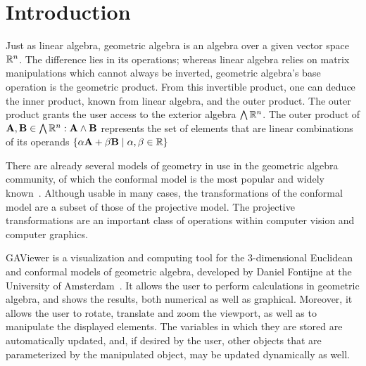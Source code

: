 \section{Introduction}
\label{ch:introduction}


Just as linear algebra, geometric algebra is an algebra over a given vector space $\mathbb{R}^n$.  The difference lies in its operations; whereas linear algebra relies on matrix manipulations which cannot always be inverted, geometric algebra's base operation is the geometric product.  From this invertible product, one can deduce the inner product, known from linear algebra, and the outer product.  The outer product grants the user access to the exterior algebra $\bigwedge \mathbb{R}^n$.  The outer product of $\mathbf{A}, \mathbf{B} \in \bigwedge \mathbb{R}^n: \mathbf{A} \wedge \mathbf{B}$ represents the set of elements that are linear combinations of its operands $\left\{\alpha \mathbf{A} + \beta \mathbf{B} \mid \alpha, \beta \in \mathbb{R} \right\}$

There are already several models of geometry in use in the geometric algebra community, of which the conformal model is the most popular and widely known~\cite{TheBook}.  Although usable in many cases, the transformations of the conformal model are a subset of those of the projective model. The projective transformations are an important class of operations within computer vision and computer graphics. 

GAViewer is a visualization and computing tool for the 3-dimensional Euclidean and conformal models of geometric algebra, developed by Daniel Fontijne at the University of Amsterdam~\cite{GAViewer}.  It allows the user to perform calculations in geometric algebra, and shows the results, both numerical as well as graphical.  Moreover, it allows the user to rotate, translate and zoom the viewport, as well as to manipulate the displayed elements.  The variables in which they are stored are automatically updated, and, if desired by the user, other objects that are parameterized by the manipulated object, may be updated dynamically as well.

